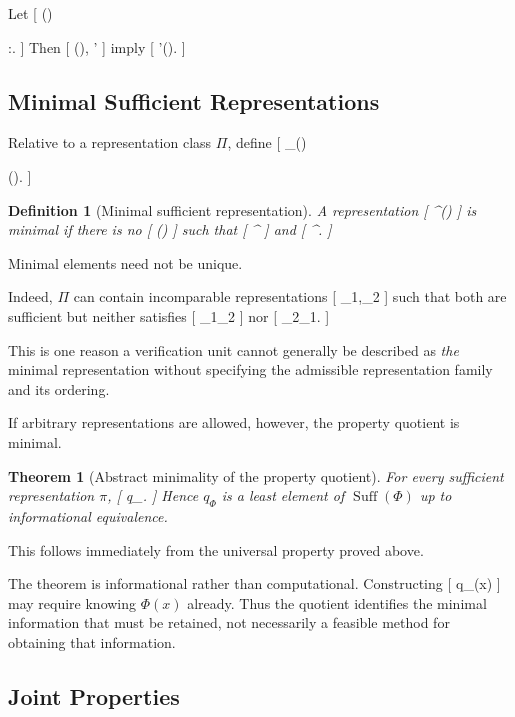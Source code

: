 \documentclass[11pt]{article}
\newtheorem{theorem}{Theorem} \newtheorem{proposition}{Proposition} \newtheorem{lemma}{Lemma} \newtheorem{corollary}{Corollary} \newtheorem{definition}{Definition} \newtheorem{remark}{Remark}
\begin{document}
Let
[
(\Phi)

{\pi:\Phi{}\pi}.
]
Then
[
\pi\in{}(\Phi),
\qquad
\pi'\succeq\pi
]
imply
[
\pi'\in{}(\Phi).
]

\subsection{Minimal Sufficient Representations}

Relative to a representation class $\Pi$, define
[
_\Pi(\Phi)

(\Phi)\cap\Pi.
]

\begin{definition}[Minimal sufficient representation]
A representation
[
\pi^\star\in{}\Pi(\Phi)
]
is minimal if there is no
[
\pi\in{}\Pi(\Phi)
]
such that
[
\pi^\star\succeq\pi
]
and
[
\pi\not\equiv\pi^\star.
]
\end{definition}

Minimal elements need not be unique.

Indeed, $\Pi$ can contain incomparable representations
[
\pi_1,\pi_2
]
such that both are sufficient but neither satisfies
[
\pi_1\succeq\pi_2
]
nor
[
\pi_2\succeq\pi_1.
]

This is one reason a verification unit cannot generally be described as \emph{the} minimal representation without specifying the admissible representation family and its ordering.

If arbitrary representations are allowed, however, the property quotient is minimal.

\begin{theorem}[Abstract minimality of the property quotient]
For every sufficient representation $\pi$,
[
\pi\succeq q_\Phi.
]
Hence $q_\Phi$ is a least element of $\operatorname{Suff}(\Phi)$ up to informational equivalence.
\end{theorem}

This follows immediately from the universal property proved above.

The theorem is informational rather than computational. Constructing
[
q_\Phi(x)
]
may require knowing $\Phi(x)$ already. Thus the quotient identifies the minimal information that must be retained, not necessarily a feasible method for obtaining that information.

\subsection{Joint Properties}
\end{document}
